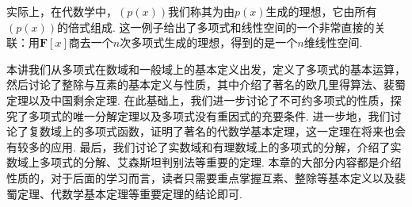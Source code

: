 实际上，在代数学中，$(p(x))$我们称其为由$p(x)$生成的理想，它由所有$(p(x))$的倍式组成. 这一例子给出了多项式和线性空间的一个非常直接的关联：用$\mathbf{F}[x]$商去一个$n$次多项式生成的理想，得到的是一个$n$维线性空间.

\begin{summary}
    本讲我们从多项式在数域和一般域上的基本定义出发，定义了多项式的基本运算，然后讨论了整除与互素的基本定义与性质，其中介绍了著名的欧几里得算法、裴蜀定理以及中国剩余定理. 在此基础上，我们进一步讨论了不可约多项式的性质，探究了多项式的唯一分解定理以及多项式没有重因式的充要条件. 进一步地，我们讨论了复数域上的多项式函数，证明了著名的代数学基本定理，这一定理在将来也会有较多的应用. 最后，我们讨论了实数域和有理数域上的多项式的分解，介绍了实数域上多项式的分解、艾森斯坦判别法等重要的定理. 本章的大部分内容都是介绍性质的，对于后面的学习而言，读者只需要重点掌握互素、整除等基本定义以及裴蜀定理、代数学基本定理等重要定理的结论即可.
\end{summary}

